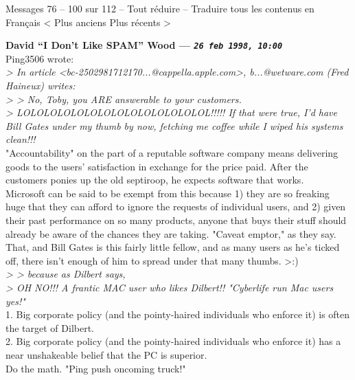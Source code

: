 \documentclass[11pt,twoside,a4paper]{article}
\begin{document}
\begin{multicols*}{2}
	  	Messages 76 -- 100 sur 112 -- Tout r{\'e}duire  --  Traduire tous les contenus en Fran\c{c}ais 	< Plus anciens  Plus r{\'e}cents >
	
		
\textbf{David ``I Don't Like SPAM'' Wood --- \emph{\texttt{26 feb 1998, 10:00}}}~\\

Ping3506 wrote:~\\
\emph{> In article <bc-2502981712170...@cappella.apple.com>, b...@wetware.com (Fred Haineux) writes:}~\\
\emph{> > No, Toby, you ARE answerable to your customers.}~\\
\emph{> LOLOLOLOLOLOLOLOLOLOLOLOLOLOL!!!!! If that were true, I'd have Bill Gates under my thumb by now, fetching me coffee while I wiped his systems clean!!!}~\\

"Accountability" on the part of a reputable software company means delivering goods to the users' satisfaction in exchange for the price paid. After the customers ponies up the old septiroop, he expects software that works.~\\

Microsoft can be said to be exempt from this because 1) they are so freaking huge that they can afford to ignore the requests of individual users, and 2) given their past performance on so many products, anyone that buys their stuff should already be aware of the chances they are taking. "Caveat emptor," as they say.~\\

That, and Bill Gates is this fairly little fellow, and as many users as he's ticked off, there isn't enough of him to spread under that many thumbs. >:)~\\

\emph{> > because as Dilbert says,}~\\

\emph{> OH NO!!! A frantic MAC user who likes Dilbert!! "Cyberlife run Mac users yes!"}~\\

1. Big corporate policy (and the pointy-haired individuals who enforce it) is often the target of Dilbert.~\\

2. Big corporate policy (and the pointy-haired individuals who enforce it) has a near unshakeable belief that the PC is superior.~\\

Do the math. "Ping push oncoming truck!"~\\


\end{multicols*}
\end{document}
